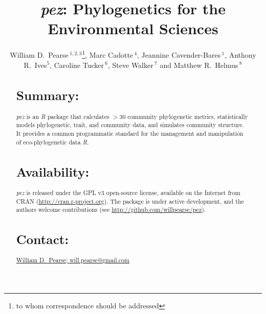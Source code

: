 \documentclass{bioinfo}
\begin{document}

\title[\emph{pez}]{\emph{pez}: Phylogenetics for the Environmental
  Sciences} \author[Pearse \textit{et~al}]{William D.\
  Pearse\,$^{1,2,3}$\footnote{to whom correspondence should be
    addressed}, Marc Cadotte\,$^{4}$, Jeannine Cavender-Bares\,$^1$,
  Anthony R.\ Ives$^5$, Caroline Tucker\,$^6$, Steve Walker\,$^7$ and
  Matthew R.\ Helmus\,$^8$} \address{$^1$Department of Ecology,
  Evolution, and Behavior, University of Minnesota, 100 Ecology
  Building, 1987 Upper Buford Circle, Saint Paul, Minnesota, USA,
  $^2$Department of Biology, McGill University, 1205 Avenue Docteur
  Penfield, Montr\'{e}al, Qu\'{e}bec, Canada, $^3$D\'{e}partement des
  Sciences Biologiques, Universit\'{e} du Qu\'{e}bec \`{a}
  Montr\'{e}al, Succursale Centre-ville, Montr\'{e}al, Qu\'{e}bec,
  Canada, $^4$Department of Biological Sciences, University of
  Toronto–Scarborough, 1265 Military Trail, Scarborough, Ontario,
  Canada, $^5$Department of Zoology, University of Wisconsin, Madison,
  Wisconsin, USA $^6$Department of Ecology and Evolutionary Biology,
  University of Colorado, Boulder, CO, USA, $^7$Department of
  Mathematics and Statistics, McMaster University, Hamilton, Ontario,
  Canada, $^8$Department of Animal Ecology, Vrije Universiteit, 1081
  HV, Amsterdam, The Netherlands} \history{} \editor{}
\maketitle
\begin{abstract}
\section{Summary:}
\emph{pez} is an \emph{R} package that calculates $>$30 community
phylogenetic metrics, statistically models phylogenetic, trait, and
community data, and simulates community structure. It provides a
common programmatic standard for the management and manipulation of
eco-phylogenetic data \emph{R}.
\section{Availability:}
\emph{pez} is released under the GPL v3 open-source license, available
on the Internet from CRAN
(\href{http://cran.r-project.org}{http://cran.r-project.org}). The
package is under active development, and the authors welcome
contributions (see
\href{http://github.com/willpearse/pez}{http://github.com/willpearse/pez}).
\section{Contact:} \href{will.pearse@gmail.com}{William D.\ Pearse; will.pearse@gmail.com}
\end{abstract}
\end{document}
